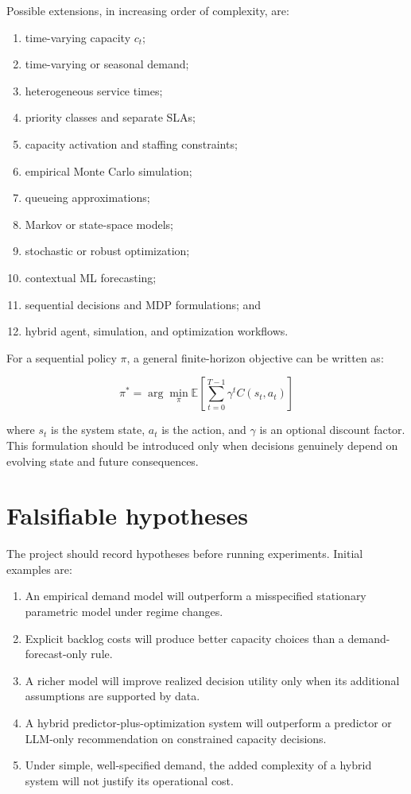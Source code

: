 \documentclass[11pt,a4paper]{article}
\newcommand{\equationnote}[1]{\begin{center}\colorbox{boxblue}{\parbox{0.92\linewidth}{\begin{equation*}#1\end{equation*}}}\end{center}}
\begin{document}
Possible extensions, in increasing order of complexity, are:
\begin{enumerate}
  \item time-varying capacity $c_t$;
  \item time-varying or seasonal demand;
  \item heterogeneous service times;
  \item priority classes and separate SLAs;
  \item capacity activation and staffing constraints;
  \item empirical Monte Carlo simulation;
  \item queueing approximations;
  \item Markov or state-space models;
  \item stochastic or robust optimization;
  \item contextual ML forecasting;
  \item sequential decisions and MDP formulations; and
  \item hybrid agent, simulation, and optimization workflows.
\end{enumerate}

For a sequential policy $\pi$, a general finite-horizon objective can be written as:

\equationnote{\pi^* = \arg\min_{\pi} \mathbb{E}\left[\sum_{t=0}^{T-1} \gamma^t C(s_t,a_t)\right]}

where $s_t$ is the system state, $a_t$ is the action, and $\gamma$ is an optional discount factor. This formulation should be introduced only when decisions genuinely depend on evolving state and future consequences.

\section{Falsifiable hypotheses}

The project should record hypotheses before running experiments. Initial examples are:
\begin{enumerate}
  \item An empirical demand model will outperform a misspecified stationary parametric model under regime changes.
  \item Explicit backlog costs will produce better capacity choices than a demand-forecast-only rule.
  \item A richer model will improve realized decision utility only when its additional assumptions are supported by data.
  \item A hybrid predictor-plus-optimization system will outperform a predictor or LLM-only recommendation on constrained capacity decisions.
  \item Under simple, well-specified demand, the added complexity of a hybrid system will not justify its operational cost.
\end{enumerate}
\end{document}
